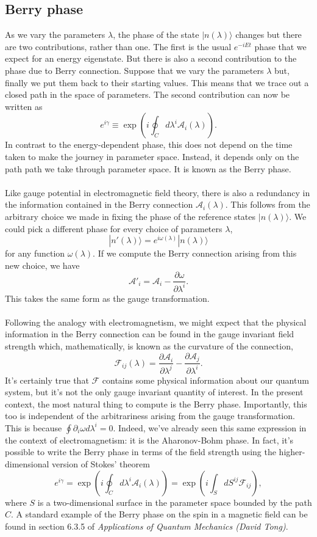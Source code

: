 \subsection{Berry phase}
As we vary the parameters $\lambda$, the phase of the state $|n(\lambda)\rangle$ changes but there are two contributions, rather than one. 
The first is the usual $e^{-iEt}$ phase that we expect for an energy eigenstate. But there is also a second contribution to the phase due to Berry connection.
Suppose that we vary the parameters $\lambda$ but, finally we put them back to their starting values. 
This means that we trace out a closed path in the space of parameters. The second contribution can now be written as
\[e^{i\gamma} \equiv \exp \left( i\oint_C d\lambda^i \mathcal{A}_i(\lambda) \right).\]
In contrast to the energy-dependent phase, this does not depend on the time taken to make the journey in parameter space. Instead, it depends only on the path path we take through parameter space. It is known as the Berry phase.
\\ \\
Like gauge potential in electromagnetic field theory, there is also a redundancy in the information contained in the Berry connection $\mathcal{A}_i(\lambda)$.
This follows from the arbitrary choice we made in fixing the phase of the reference states $|n(\lambda)\rangle$. We could pick a different phase for every choice of parameters $\lambda$,
\[|n'(\lambda)\rangle = e^{i\omega(\lambda)} |n(\lambda)\rangle\]
for any function $\omega(\lambda)$. 
If we compute the Berry connection arising from this new choice, we have
\[\mathcal{A}'_i = \mathcal{A}_i - \frac{\partial \omega}{\partial \lambda^i} .\]
This takes the same form as the gauge transformation.
\\ \\
Following the analogy with electromagnetism, we might expect that the physical information in the Berry connection can be found in the gauge invariant field strength which, mathematically, is known as the curvature of the connection,
\[\mathcal{F}_{ij}(\lambda) = \frac{\partial \mathcal{A}_i}{\partial \lambda^j} -  \frac{\partial \mathcal{A}_j}{\partial \lambda^i}.\]
It's certainly true that $\mathcal{F}$ contains some physical information about our quantum system, but it's not the only gauge invariant quantity of interest. In the present context, the most natural thing to compute is the Berry phase. Importantly, this too is independent of the arbitrariness arising from the gauge transformation. 
This is because $\oint \partial_i \omega d\lambda^i = 0$. Indeed, we've already seen this same expression in the context of electromagnetism: it is the Aharonov-Bohm phase.
In fact, it's possible to write the Berry phase in terms of the field strength using the higher-dimensional version of Stokes' theorem
\[e^{i\gamma} = \exp \left( i\oint_C d\lambda^i \mathcal{A}_i(\lambda) \right) = \exp \left( i\int_S dS^{ij} \mathcal{F}_{ij} \right),\]
where $S$ is a two-dimensional surface in the parameter space bounded by the path $C$.
A standard example of the Berry phase on the spin in a magnetic field can be found in section 6.3.5 of 
\emph{Applications of Quantum Mechanics (David Tong)}. 

